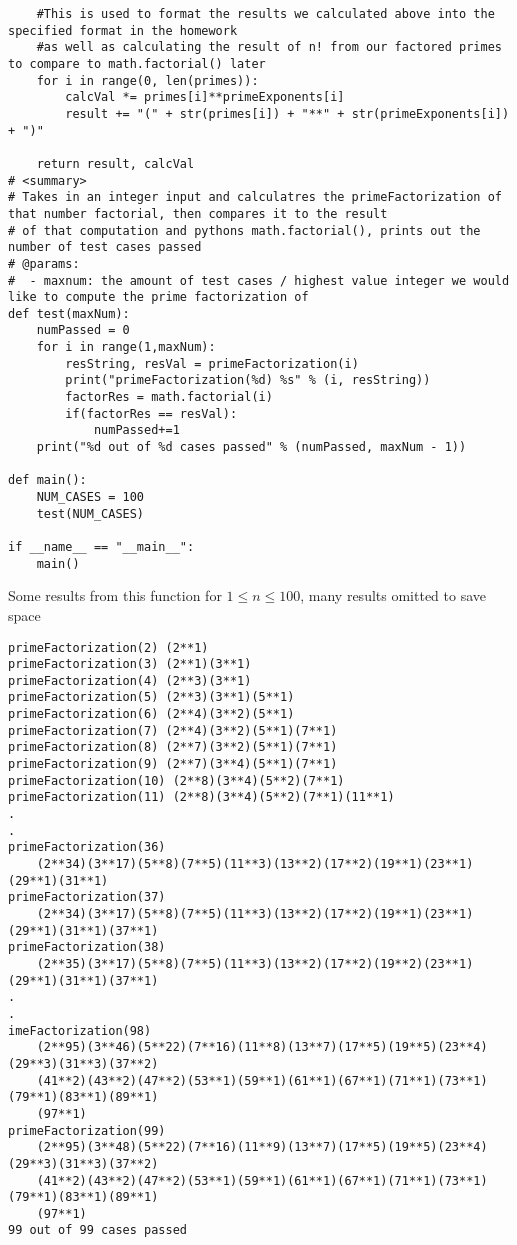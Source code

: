 \documentclass[12pt]{article}
\begin{document}
\begin{enumerate}
\begin{lstlisting}
    #This is used to format the results we calculated above into the specified format in the homework
    #as well as calculating the result of n! from our factored primes to compare to math.factorial() later
    for i in range(0, len(primes)):
        calcVal *= primes[i]**primeExponents[i]
        result += "(" + str(primes[i]) + "**" + str(primeExponents[i]) + ")"

    return result, calcVal
# <summary>
# Takes in an integer input and calculatres the primeFactorization of that number factorial, then compares it to the result
# of that computation and pythons math.factorial(), prints out the number of test cases passed
# @params:
#  - maxnum: the amount of test cases / highest value integer we would like to compute the prime factorization of
def test(maxNum):
    numPassed = 0
    for i in range(1,maxNum):
        resString, resVal = primeFactorization(i)
        print("primeFactorization(%d) %s" % (i, resString))
        factorRes = math.factorial(i)
        if(factorRes == resVal):
            numPassed+=1
    print("%d out of %d cases passed" % (numPassed, maxNum - 1))

def main():
    NUM_CASES = 100
    test(NUM_CASES)   
    
if __name__ == "__main__":
    main()
    \end{lstlisting}

    Some results from this function for $ 1 \le n \le 100 $, many results omitted to save space
    \begin{lstlisting}
primeFactorization(2) (2**1)
primeFactorization(3) (2**1)(3**1)
primeFactorization(4) (2**3)(3**1)
primeFactorization(5) (2**3)(3**1)(5**1)
primeFactorization(6) (2**4)(3**2)(5**1)
primeFactorization(7) (2**4)(3**2)(5**1)(7**1)
primeFactorization(8) (2**7)(3**2)(5**1)(7**1)
primeFactorization(9) (2**7)(3**4)(5**1)(7**1)
primeFactorization(10) (2**8)(3**4)(5**2)(7**1)
primeFactorization(11) (2**8)(3**4)(5**2)(7**1)(11**1)
.
.
primeFactorization(36) 
    (2**34)(3**17)(5**8)(7**5)(11**3)(13**2)(17**2)(19**1)(23**1)(29**1)(31**1)
primeFactorization(37) 
    (2**34)(3**17)(5**8)(7**5)(11**3)(13**2)(17**2)(19**1)(23**1)(29**1)(31**1)(37**1)
primeFactorization(38) 
    (2**35)(3**17)(5**8)(7**5)(11**3)(13**2)(17**2)(19**2)(23**1)(29**1)(31**1)(37**1)
.
.
imeFactorization(98) 
    (2**95)(3**46)(5**22)(7**16)(11**8)(13**7)(17**5)(19**5)(23**4)(29**3)(31**3)(37**2)
    (41**2)(43**2)(47**2)(53**1)(59**1)(61**1)(67**1)(71**1)(73**1)(79**1)(83**1)(89**1)
    (97**1)
primeFactorization(99) 
    (2**95)(3**48)(5**22)(7**16)(11**9)(13**7)(17**5)(19**5)(23**4)(29**3)(31**3)(37**2)
    (41**2)(43**2)(47**2)(53**1)(59**1)(61**1)(67**1)(71**1)(73**1)(79**1)(83**1)(89**1)
    (97**1)
99 out of 99 cases passed
    \end{lstlisting}


\end{enumerate}
\end{document}
